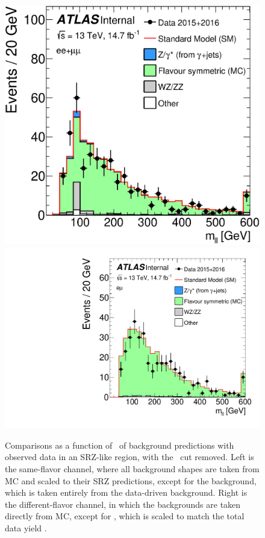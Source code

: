 \begin{centering}
\begin{figure}[!hbt]
\myfloatalign
\includegraphics[width=.48\linewidth]{figures/results/mll_SF_R_a_SCALED.eps}
\includegraphics[width=.48\linewidth]{figures/results/mll_DF_R_a_SCALED.pdf}
\caption{Comparisons as a function of \mll~of background predictions with observed data in an SRZ-like region, with the \mll~cut removed. Left is the same-flavor channel, where all background shapes are taken from \ac{MC} and scaled to their SRZ predictions, except for the \dyjets background, which is taken entirely from the data-driven background. Right is the different-flavor channel, in which the backgrounds are taken directly from \ac{MC}, except for \ttbar, which is scaled to match the total data yield \cite{this_paper}. }
\label{fig:results_widemll}
\end{figure}
\end{centering}

